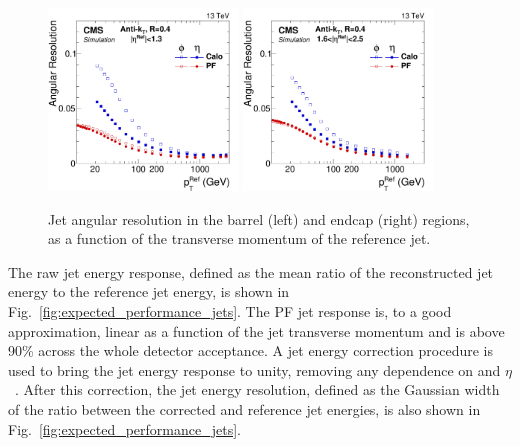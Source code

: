 \begin{figure}[htb]\centering 
\includegraphics[width=0.45\textwidth]{figs/cms/EtaPhiResVsRefPt_Barrel_AK4CaloL2L3_AK4PFL2L3_RMS_no2000.pdf} 
\includegraphics[width=0.45\textwidth]{figs/cms/EtaPhiResVsRefPt_Endcap_AK4CaloL2L3_AK4PFL2L3_RMS_no2000.pdf}
\caption{Jet angular resolution in the barrel (left) and endcap (right) regions, as a function of the transverse momentum of the reference jet.\label{fig:expected_performance_jets_angular}}
\end{figure}



The raw jet energy response, defined as the mean ratio of the
reconstructed jet energy to the reference jet energy, is shown in
Fig.~\ref{fig:expected_performance_jets}. The PF jet response is, to a
good approximation, linear as a function of the jet transverse momentum and is above 90\%
across the whole detector acceptance. A jet energy correction procedure is used to bring the jet energy
response to unity, removing any dependence on \pt and
$\eta$~\cite{Khachatryan:2016kdb}. After this correction, the jet
energy resolution, defined as the Gaussian width of the ratio between
the corrected and reference jet energies, is also shown in Fig.~\ref{fig:expected_performance_jets}.

